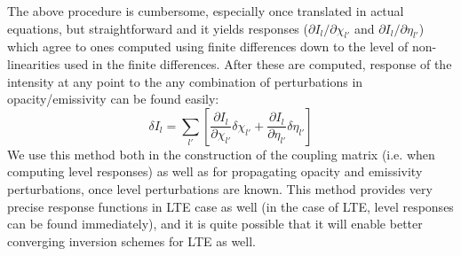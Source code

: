 \documentclass[referee]{aa}
\begin{document}
The above procedure is cumbersome, especially once translated in actual equations, but straightforward and it yields responses ($\partial I_{l}/\partial \chi_{l'}$ and $\partial I_{l}/\partial \eta_{l'}$) which agree to ones computed using finite differences down to the level of non-linearities used in the finite differences. After these are computed, response of the intensity at any point to the any combination of perturbations in opacity/emissivity can be found easily:
\begin{equation}
 \delta I_l = \sum_{l'} \left [ \frac{\partial I_l}{\partial \chi_{l'}} \delta \chi_{l'} + \frac{\partial I_l}{\partial \eta_{l'}} \delta \eta_{l'} \right ]
\end{equation}
We use this method both in the construction of the coupling matrix (i.e. when computing level responses) as well as for propagating opacity and emissivity perturbations, once level perturbations are known. This method provides very precise response functions in LTE case as well (in the case of LTE, level responses can be found immediately), and it is quite possible that it will enable better converging inversion schemes for LTE as well.






 



\end{document}
